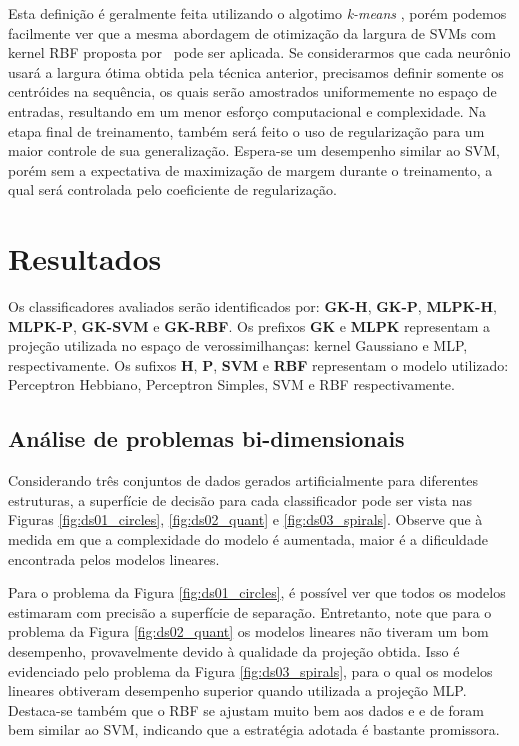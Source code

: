 \documentclass[conference]{IEEEtran}
\begin{document}
	Esta definição é geralmente feita utilizando o algotimo \textit{k-means} \cite{haykin2007neural}, porém podemos facilmente ver que a mesma abordagem de otimização da largura de SVMs com kernel RBF proposta por~\cite{menezes2019width} pode ser aplicada. Se considerarmos que cada neurônio usará a largura ótima obtida pela técnica anterior, precisamos definir somente os centróides na sequência, os quais serão amostrados uniformemente no espaço de entradas, resultando em um menor esforço computacional e complexidade. Na etapa final de treinamento, também será feito o uso de regularização para um maior controle de sua generalização. Espera-se um desempenho similar ao SVM, porém sem a expectativa de maximização de margem durante o treinamento, a qual será controlada pelo coeficiente de regularização.
	
	\section{Resultados}
	Os classificadores avaliados serão identificados por: \textbf{GK-H}, \textbf{GK-P}, \textbf{MLPK-H}, \textbf{MLPK-P}, \textbf{GK-SVM} e \textbf{GK-RBF}. Os prefixos \textbf{GK} e \textbf{MLPK} representam a projeção utilizada no espaço de verossimilhanças: kernel Gaussiano e MLP, respectivamente. Os sufixos \textbf{H}, \textbf{P}, \textbf{SVM} e \textbf{RBF} representam o modelo utilizado: Perceptron Hebbiano, Perceptron Simples, SVM e RBF respectivamente.
	
	\subsection{Análise de problemas bi-dimensionais}
	Considerando três conjuntos de dados gerados artificialmente para diferentes estruturas, a superfície de decisão para cada classificador pode ser vista nas Figuras \ref{fig:ds01_circles}, \ref{fig:ds02_quant} e \ref{fig:ds03_spirals}. Observe que à medida em que a complexidade do modelo é aumentada, maior é a dificuldade encontrada pelos modelos lineares. 
	
	Para o problema da Figura \ref{fig:ds01_circles}, é possível ver que todos os modelos estimaram com precisão a superfície de separação. Entretanto, note que para o problema da Figura \ref{fig:ds02_quant} os modelos lineares não tiveram um bom desempenho, provavelmente devido à qualidade da projeção obtida. Isso é evidenciado pelo problema da Figura \ref{fig:ds03_spirals}, para o qual os modelos lineares obtiveram desempenho superior quando utilizada a projeção MLP. Destaca-se também que o RBF se ajustam muito bem aos dados e e de foram bem similar ao SVM, indicando que a estratégia adotada é bastante promissora.
	
\end{document}
